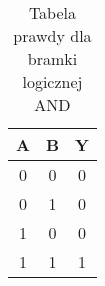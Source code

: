 \begin{table}[h]
\centering
\begin{tabular}{||c c c||} 
 \hline
 A & B & Y \\ [0.5ex] 
 \hline\hline
 0 & 0 & 0 \\ 
 \hline
 0 & 1 & 0 \\
 \hline
 1 & 0 & 0 \\
 \hline
 1 & 1 & 1 \\
 \hline
\end{tabular}
\label{tab:tabela5}
\caption{Tabela prawdy dla bramki logicznej AND}
\end{table}